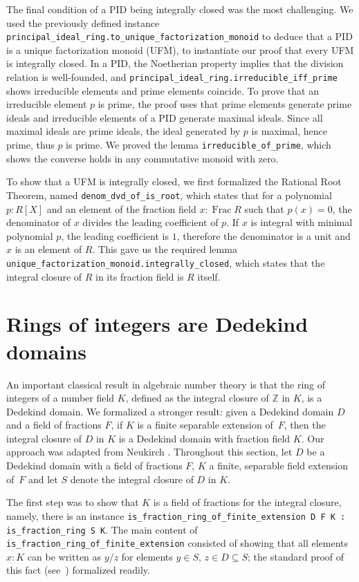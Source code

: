 \documentclass[sn-mathphys]{sn-jnl}%
\newcommand{\lean}[1]{\texttt{#1}\xspace}
\renewcommand{\Z}{\mathbb{Z}}
\DeclareMathOperator{\Frac}{Frac}
\begin{document}
The final condition of a PID being integrally closed was the most challenging.
We used the previously defined instance \lean{principal\_ideal\_ring.to\_\-unique\-\_factorization\_monoid} to deduce that a PID is a unique factorization monoid (UFM),
to instantiate our proof that every UFM is integrally closed.
In a PID, the Noetherian property implies that the division relation is well-founded,
and \lean{principal\_ideal\_ring.irreducible\_iff\_prime} shows irreducible elements and prime elements coincide.
To prove that an irreducible element $p$ is prime, the proof uses that prime elements generate prime ideals and irreducible elements of a PID generate maximal ideals. Since all maximal ideals are prime ideals, the ideal generated by $p$ is maximal, hence prime, thus $p$ is prime.
We proved the lemma \lean{irreducible\_of\_prime}, which shows the converse holds in any commutative monoid with zero.

To show that a UFM is integrally closed, we first formalized the Rational Root Theorem, named \lean{denom\_dvd\_of\_is\_root},
which states that for a polynomial $p : R[X]$ and an element of the fraction field $x : \Frac R$ such that $p(x) = 0$, the denominator of $x$ divides the leading coefficient of $p$.
If $x$ is integral with minimal polynomial $p$, the leading coefficient is $1$, therefore the denominator is a unit and $x$ is an element of $R$.
This gave us the required lemma \lean{unique\_factorization\_monoid.integrally\_closed}, which states that the integral closure of $R$ in its fraction field is $R$ itself.

\section{Rings of integers are Dedekind domains} \label{sec:integral-closure}

An important classical result in algebraic number theory is that the ring of integers of a number field $K$, defined as the integral closure of $\Z$ in $K$, is a Dedekind domain. We formalized a stronger result: given a Dedekind domain $D$ and a field of fractions $F$, if $K$ is a finite separable extension of~$F$, then the integral closure of $D$ in $K$ is a Dedekind domain with fraction field $K$.
Our approach was adapted from Neukirch \cite[Theorem~3.1]{Neukirch}.
Throughout this section, let $D$ be a Dedekind domain with a field of fractions $F$, $K$ a finite, separable field extension of~$F$ and let $S$ denote the integral closure of $D$ in $K$.

The first step was to show that $K$ is a field of fractions for the integral closure, namely, there is an instance \lean{is\_fraction\_ring\_of\_finite\_extension D F K : is\_fraction\_ring S K}.
The main content of \lean{is\_fraction\_ring\_\-of\-\_finite\-\_extension} consisted of showing that all elements $x : K$ can be written as $y / z$ for elements $y \in S$, $z \in D \subseteq S$;
the standard proof of this fact (see~\cite[Theorem~15.29]{Dummit-and-Foote}) formalized readily.
\end{document}
